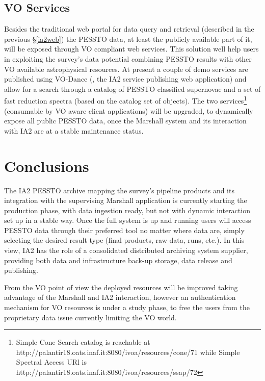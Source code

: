 \subsection{VO Services}\label{vo}
Besides the traditional web portal for data query and retrieval (described in the previous \S \ref{ia2web}) the PESSTO data, at least the publicly available part of it, will be exposed through VO compliant web services. This solution well help users in exploiting the survey's data potential combining PESSTO results with other VO available astrophysical resources. At present a couple of demo services are published using VO-Dance (\cite{molinaro_spie12}, the IA2 service publishing web application) and allow for a search through a catalog of PESSTO classified supernovae and a set of fast reduction spectra (based on the catalog set of objects). The two services\footnote{Simple Cone Search catalog is reachable at http://palantir18.oats.inaf.it:8080/ivoa/resources/cone/71 while Simple Spectral Access URl is http://palantir18.oats.inaf.it:8080/ivoa/resources/ssap/72} (consumable by VO aware client applications) will be upgraded, to dynamically expose all public PESSTO data, once the Marshall system and its interaction with IA2 are at a stable maintenance status.

\section{Conclusions}

The IA2 PESSTO archive mapping the survey's pipeline products and its integration with the supervising Marshall application is currently starting the production phase, with data ingestion ready, but not with dynamic interaction set up in a stable way. Once the full system is up and running users will access PESSTO data through their preferred tool no matter where data are, simply selecting the desired result type (final products, raw data, runs, etc.). In this view, IA2 has the role of a consolidated distributed archiving system supplier, providing both data and infrastructure back-up storage, data release and publishing.

From the VO point of view the deployed resources will be improved taking advantage of the Marshall and IA2 interaction, however an authentication mechanism for VO resources is under a study phase, to free the users from the proprietary data issue currently limiting the VO world.


